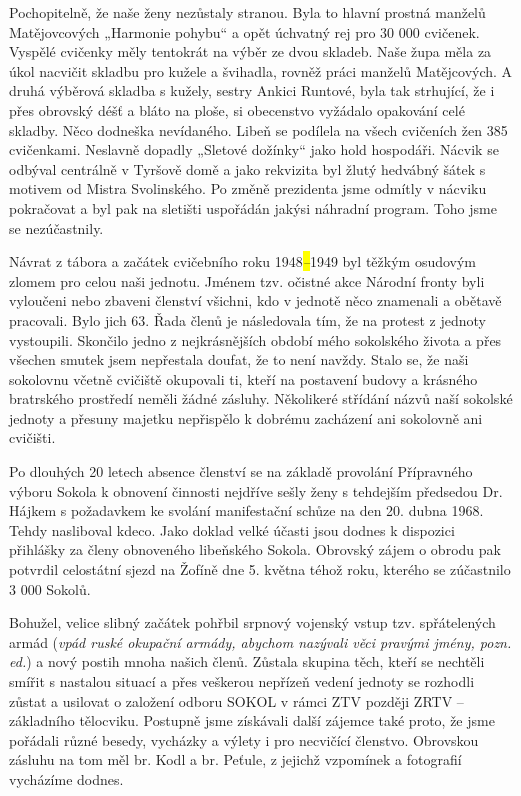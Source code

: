 Pochopitelně, že naše ženy nezůstaly stranou. Byla to hlavní prostná
manželů Matějovcových „Harmonie pohybu`` a opět úchvatný rej pro 30 000
cvičenek. Vyspělé cvičenky měly tentokrát na výběr ze dvou skladeb. Naše
župa měla za úkol nacvičit skladbu pro kužele a švihadla, rovněž práci
manželů Matějcových. A druhá výběrová skladba s kužely, sestry Ankici
Runtové, byla tak strhující, že i přes obrovský déšť a bláto na ploše,
si obecenstvo vyžádalo opakování celé skladby. Něco dodneška nevídaného.
Libeň se podílela na všech cvičeních žen 385 cvičenkami. Neslavně
dopadly „Sletové dožínky`` jako hold hospodáři. Nácvik se odbýval
centrálně v Tyršově domě a jako rekvizita byl žlutý hedvábný šátek s
motivem od Mistra Svolinského. Po změně prezidenta jsme odmítly v
nácviku pokračovat a byl pak na sletišti uspořádán jakýsi náhradní
program. Toho jsme se nezúčastnily.

Návrat z tábora a začátek cvičebního roku 1948\emph{\hl{--}}1949 byl
těžkým osudovým zlomem pro celou naši jednotu. Jménem tzv. očistné akce
Národní fronty byli vyloučeni nebo zbaveni členství všichni, kdo v
jednotě něco znamenali a obětavě pracovali. Bylo jich 63. Řada členů je
následovala tím, že na protest z jednoty vystoupili. Skončilo jedno z
nejkrásnějších období mého sokolského života a přes všechen smutek jsem
nepřestala doufat, že to není navždy. Stalo se, že naši sokolovnu včetně
cvičiště okupovali ti, kteří na postavení budovy a krásného bratrského
prostředí neměli žádné zásluhy. Několikeré střídání názvů naší sokolské
jednoty a přesuny majetku nepřispělo k dobrému zacházení ani sokolovně
ani cvičišti.

Po dlouhých 20 letech absence členství se na základě provolání
Přípravného výboru Sokola k obnovení činnosti nejdříve sešly ženy s
tehdejším předsedou Dr. Hájkem s požadavkem ke svolání manifestační
schůze na den 20. dubna 1968. Tehdy nasliboval kdeco. Jako doklad velké
účasti jsou dodnes k dispozici přihlášky za členy obnoveného libeňského
Sokola. Obrovský zájem o obrodu pak potvrdil celostátní sjezd na Žofíně
dne 5. května téhož roku, kterého se zúčastnilo 3 000 Sokolů.

Bohužel, velice slibný začátek pohřbil srpnový vojenský vstup tzv.
spřátelených armád (\emph{vpád ruské okupační armády, abychom nazývali
věci pravými jmény, pozn. ed.}) a nový postih mnoha našich členů.
Zůstala skupina těch, kteří se nechtěli smířit s nastalou situací a přes
veškerou nepřízeň vedení jednoty se rozhodli zůstat a usilovat o
založení odboru SOKOL v rámci ZTV později ZRTV -- základního tělocviku.
Postupně jsme získávali další zájemce také proto, že jsme pořádali různé
besedy, vycházky a výlety i pro necvičící členstvo. Obrovskou zásluhu na
tom měl br. Kodl a br. Peťule, z jejichž vzpomínek a fotografií
vycházíme dodnes.

